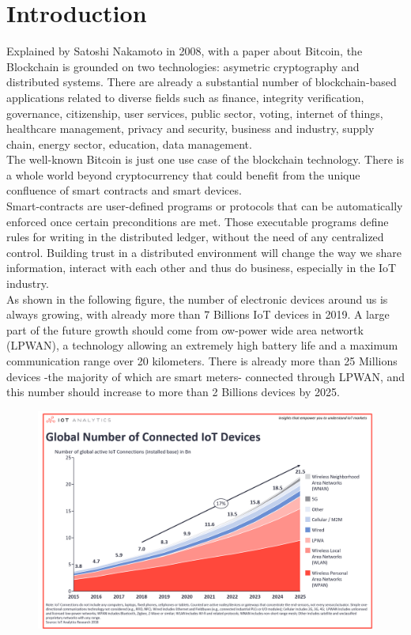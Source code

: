 \documentclass[11pt]{article}
\begin{document}
\section{Introduction}
Explained by Satoshi Nakamoto in 2008, with a paper about Bitcoin, the Blockchain is grounded on two technologies: asymetric cryptography and distributed systems. There are already a substantial number of blockchain-based applications related to diverse fields such as finance, integrity verification, governance, citizenship, user services, public sector, voting, internet of things, healthcare management, privacy and security, business and industry, supply chain, energy sector, education, data management.\cite{1} \\
The well-known Bitcoin is just one use case of the blockchain technology. There is a whole world beyond cryptocurrency that could benefit from the unique confluence of smart contracts and smart devices.\\
Smart-contracts are user-defined programs or protocols that can be automatically enforced once certain preconditions are met. Those executable programs define rules for writing in the distributed ledger, without the need of any centralized control. Building trust in a distributed environment will change the way we share information, interact with each other and thus do business, especially in the IoT industry.\cite{2}\\
As shown in the following figure\cite{3}, the number of electronic devices around us is always growing, with already more than 7 Billions IoT devices in 2019. A large part of the future growth should come from ow-power wide area networtk (LPWAN), a technology allowing an extremely high battery life and a maximum communication range over 20 kilometers. There is already more than 25 Millions devices -the majority of which are smart meters- connected through LPWAN, and this number should increase to more than 2 Billions devices by 2025.\\
\begin{figure}[h]
	\centering
	\includegraphics[width=0.8\linewidth]{stateofIoT2018.png}
\end{figure}\\
\end{document}
